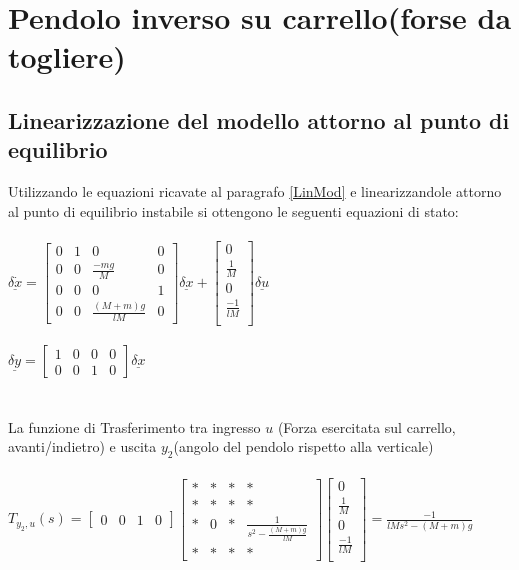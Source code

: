 \chapter{Pendolo inverso su carrello(forse da togliere)}
\section{Linearizzazione del modello attorno al punto di equilibrio}

Utilizzando le equazioni ricavate al paragrafo \ref{LinMod} e linearizzandole attorno al punto di equilibrio instabile si ottengono le seguenti equazioni di stato:\\\\
$\underline{\delta\dot{x}}=
\begin{bmatrix}
0&1&0&0\\
0&0&\displaystyle\frac{-mg}{M}&0\\
0&0&0&1\\
0&0&\displaystyle\frac{(M+m)g}{lM}&0
\end{bmatrix}
\underline{\delta x}+
\begin{bmatrix}
0\\
\displaystyle\frac{1}{M}\\
0\\
\displaystyle\frac{-1}{lM}\\
\end{bmatrix}
\underline{\delta u}
$\\\\
$\underline{\delta y}=
\begin{bmatrix}
1&0&0&0\\
0&0&1&0
\end{bmatrix}
\underline{\delta x}
$\\\\\\
La funzione di Trasferimento tra ingresso $u$ (Forza esercitata sul carrello, avanti/indietro) e uscita $y_2$(angolo del pendolo rispetto alla verticale)\\\\
$T_{y_2,u}(s)=
\begin{bmatrix}
0&0&1&0
\end{bmatrix}
\begin{bmatrix}
*&*&*&*\\
*&*&*&*\\
*&0&*&\displaystyle\frac{1}{s^2-\frac{(M+m)g}{lM}}\\
*&*&*&*
\end{bmatrix}
\begin{bmatrix}
0\\
\displaystyle\frac{1}{M}\\
0\\
\displaystyle\frac{-1}{lM}\\
\end{bmatrix}
=\displaystyle\frac{-1}{lMs^2-(M+m)g}
$




